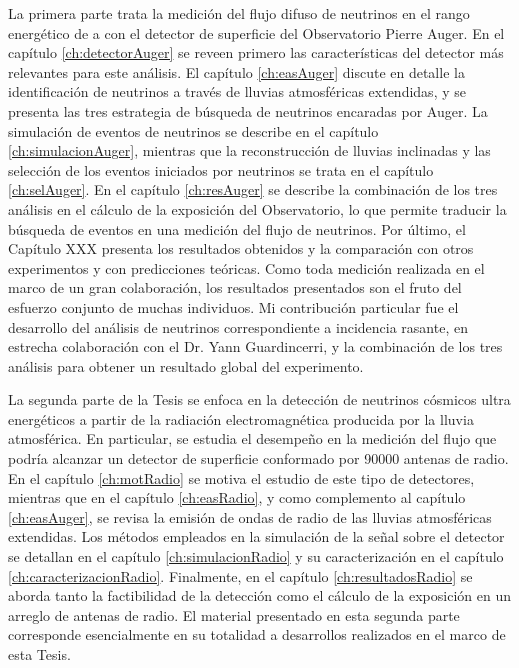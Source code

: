 La primera parte trata la medici\'on del flujo difuso de neutrinos en el rango energ\'etico de  a  con el detector de superficie del Observatorio Pierre Auger. En el cap\'itulo \ref{ch:detectorAuger} se reveen primero las caracter\'isticas del detector m\'as relevantes para este análisis.
El cap\'itulo \ref{ch:easAuger} discute en detalle la identificación de neutrinos a través de lluvias atmosf\'ericas extendidas, y se presenta las tres estrategia de búsqueda de neutrinos encaradas por Auger. La simulación de eventos de neutrinos se describe en el cap\'itulo \ref{ch:simulacionAuger}, mientras que la reconstrucci\'on de lluvias inclinadas y las selecci\'on de los eventos iniciados por neutrinos se trata en el cap\'itulo \ref{ch:selAuger}.
En el cap\'itulo \ref{ch:resAuger} se describe la combinación de los tres análisis en el c\'alculo de la exposici\'on del Observatorio, lo que permite traducir la búsqueda de eventos en una medición del flujo de neutrinos. Por último, el Capítulo XXX presenta los resultados obtenidos y la comparación con otros experimentos y con predicciones te\'oricas. Como toda medición realizada en el marco de un gran colaboración, los resultados presentados son el fruto del esfuerzo conjunto de muchas individuos. Mi contribución particular fue el desarrollo del análisis de neutrinos correspondiente a incidencia rasante, en estrecha colaboración con el Dr. Yann Guardincerri, y la combinación de los tres análisis para obtener un resultado global del experimento.

La segunda parte de la Tesis se enfoca en la detecci\'on de neutrinos c\'osmicos ultra energ\'eticos a partir de la radiaci\'on electromagn\'etica producida por la lluvia atmosf\'erica.  En particular, se estudia el desempe\~no en la medici\'on del flujo que podr\'ia alcanzar un detector de superficie conformado por 90000 antenas de radio.
En el cap\'itulo \ref{ch:motRadio} se motiva el estudio de este tipo de detectores, mientras que en el cap\'itulo \ref{ch:easRadio}, y como complemento al cap\'itulo \ref{ch:easAuger}, se revisa la emisi\'on de ondas de radio de las lluvias atmosf\'ericas extendidas.
Los m\'etodos empleados en la simulaci\'on de la se\~nal sobre el detector se detallan en el cap\'itulo \ref{ch:simulacionRadio} y su caracterizaci\'on en el cap\'itulo \ref{ch:caracterizacionRadio}.
Finalmente, en el cap\'itulo \ref{ch:resultadosRadio} se aborda tanto la factibilidad de la detecci\'on como el c\'alculo de la exposici\'on en un arreglo de antenas de radio. El material presentado en esta segunda parte corresponde esencialmente en su totalidad a desarrollos realizados en el marco de esta Tesis.

